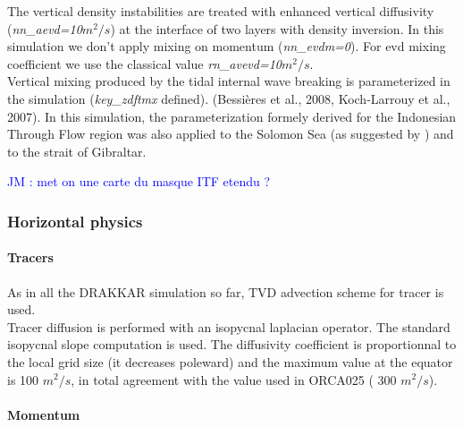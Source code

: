 The vertical density instabilities are treated with enhanced vertical diffusivity (\textit{nn\_aevd=10$m^2/s$}) at the interface 
of two layers with density inversion. In this simulation we don't apply mixing on momentum (\textit{nn\_evdm=0}). 
For evd mixing coefficient we use the classical value \textit{rn\_avevd=10$m^2/s$}.\\

Vertical mixing produced by the tidal internal wave breaking is parameterized in the simulation (\textit{key\_zdftmx} defined). 
(Bessi\`eres et al., 2008\cite{Bessiere_al_GRL08}, Koch-Larrouy et al., 2007\cite{Koch-Larrouy_al_GRL07}).
In this simulation, the parameterization formely derived for the Indonesian
Through Flow region was also applied to the Solomon Sea (as suggested by \cite{Melet} ) and to the strait of Gibraltar. 

\textcolor{blue}{ JM : met on une carte du masque ITF etendu ? }

\subsubsection{Horizontal physics}

\paragraph{Tracers \\}

As in all the DRAKKAR simulation so far, TVD advection scheme for tracer is used. \\

Tracer diffusion is performed with an isopycnal laplacian operator. The standard isopycnal slope computation is used.
The diffusivity coefficient is proportionnal to the local grid size (it decreases poleward) and the maximum value at the
equator is 100 $m^2/s$, in total agreement with the value used in ORCA025 ( 300 $m^2/s$). \\


\paragraph{Momentum \\}

